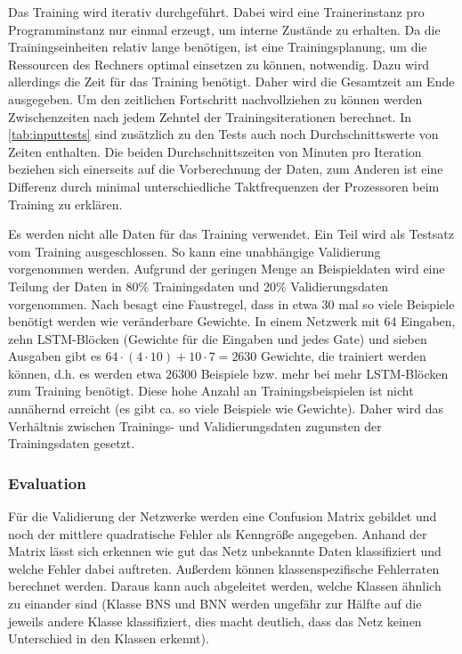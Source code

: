 Das Training wird iterativ durchgeführt. Dabei wird eine Trainerinstanz pro
Programminstanz nur einmal erzeugt, um interne Zustände zu erhalten. Da die
Trainingseinheiten relativ lange benötigen, ist eine Trainingsplanung, um die
Ressourcen des Rechners optimal einsetzen zu können, notwendig. Dazu wird
allerdings die Zeit für das Training benötigt. Daher wird die Gesamtzeit am Ende
ausgegeben. Um den zeitlichen Fortschritt nachvollziehen zu können werden
Zwischenzeiten nach jedem Zehntel der Trainingsiterationen berechnet. In
\autoref{tab:inputtests} sind zusätzlich zu den Tests auch noch
Durchschnittswerte von Zeiten enthalten. Die beiden Durchschnittszeiten von
Minuten pro Iteration beziehen sich einerseits auf die Vorberechnung der Daten,
zum Anderen ist eine Differenz durch minimal unterschiedliche Taktfrequenzen der
Prozessoren beim Training zu erklären.

Es werden nicht alle Daten für das Training verwendet. Ein Teil wird als
Testsatz vom Training ausgeschlossen. So kann eine unabhängige Validierung
vorgenommen werden. Aufgrund der geringen Menge an Beispieldaten wird eine
Teilung der Daten in 80\% Trainingsdaten und 20\% Validierungsdaten vorgenommen.
Nach \cite{NNFAQ} besagt eine Faustregel, dass in etwa 30 mal so viele Beispiele
benötigt werden wie veränderbare Gewichte. In einem Netzwerk mit 64 Eingaben,
zehn \ac{LSTM}-Blöcken (Gewichte für die Eingaben und jedes Gate) und sieben
Ausgaben gibt es $64\cdot(4\cdot10)+10\cdot7 = 2630$ Gewichte, die trainiert
werden können, d.h. es werden etwa $26300$ Beispiele bzw. mehr bei mehr
\ac{LSTM}-Blöcken zum Training benötigt. Diese hohe Anzahl an
Trainingsbeispielen ist nicht annähernd erreicht (es gibt ca. so viele Beispiele
wie Gewichte). Daher wird das Verhältnis zwischen Trainings- und
Validierungsdaten zugunsten der Trainingsdaten gesetzt.

\subsubsection{Evaluation}
Für die Validierung der Netzwerke werden eine Confusion Matrix gebildet und noch
der mittlere quadratische Fehler als Kenngröße angegeben. Anhand der Matrix
lässt sich erkennen wie gut das Netz unbekannte Daten klassifiziert und welche
Fehler dabei auftreten. Außerdem können klassenspezifische Fehlerraten berechnet
werden. Daraus kann auch abgeleitet werden, welche Klassen ähnlich zu einander
sind (Klasse \ac{BNS} und \ac{BNN} werden ungefähr zur Hälfte auf die jeweils
andere Klasse klassifiziert, dies macht deutlich, dass das Netz keinen
Unterschied in den Klassen erkennt).

